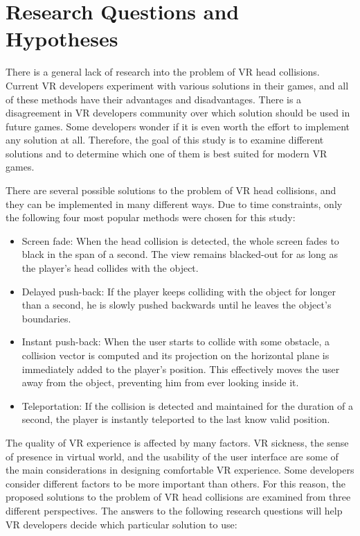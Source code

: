 \section{Research Questions and Hypotheses}

There is a general lack of research into the problem of VR head collisions. Current VR developers experiment with various solutions in their games, and all of these methods have their advantages and disadvantages. There is a disagreement in VR developers community over which solution should be used in future games. Some developers wonder if it is even worth the effort to implement any solution at all. Therefore, the goal of this study is to examine different solutions and to determine which one of them is best suited for modern VR games.
 
There are several possible solutions to the problem of VR head collisions, and they can be implemented in many different ways. Due to time constraints, only the following four most popular methods were chosen for this study:

\begin{itemize}
\item Screen fade: When the head collision is detected, the whole screen fades to black in the span of a second. The view remains blacked-out for as long as the player's head collides with the object.
\item Delayed push-back: If the player keeps colliding with the object for longer than a second, he is slowly pushed backwards until he leaves the object's boundaries.
\item Instant push-back: When the user starts to collide with some obstacle, a collision vector is computed and its projection on the horizontal plane is immediately added to the player's position. This effectively moves the user away from the object, preventing him from ever looking inside it.
\item Teleportation: If the collision is detected and maintained for the duration of a second, the player is instantly teleported to the last know valid position. 
\end{itemize}

The quality of VR experience is affected by many factors. VR sickness, the sense of presence in virtual world, and the usability of the user interface are some of the main considerations in designing comfortable VR experience. Some developers consider different factors to be more important than others. For this reason, the proposed solutions to the problem of VR head collisions are examined from three different perspectives. The answers to the following research questions will help VR developers decide which particular solution to use:


